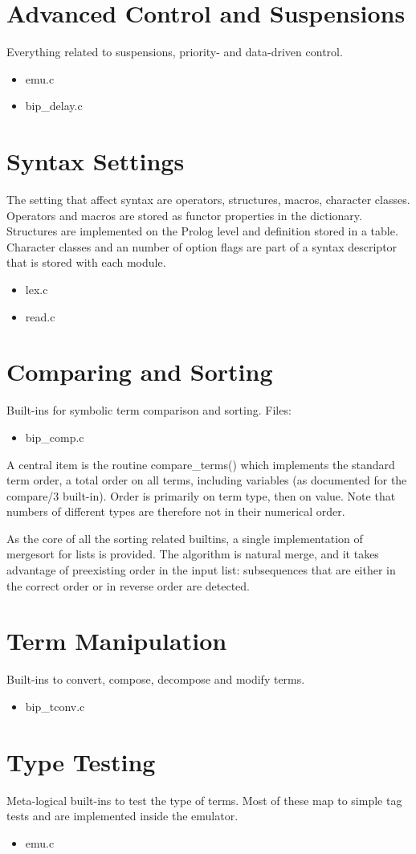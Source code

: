 \section{Advanced Control and Suspensions }
     Everything related to suspensions, priority- and data-driven control.
     \begin{itemize}
     \item emu.c
     \item bip_delay.c
     \end{itemize}

\section{Syntax Settings }
The setting that affect syntax are operators, structures, macros,
character classes.  Operators and macros are stored as functor
properties in the dictionary.  Structures are implemented on the
Prolog level and definition stored in a table. Character classes and
an number of option flags are part of a syntax descriptor that is stored
with each module.
     \begin{itemize}
     \item lex.c
     \item read.c
     \end{itemize}

\section{Comparing and Sorting }
Built-ins for symbolic term comparison and sorting. Files:
     \begin{itemize}
     \item bip_comp.c
     \end{itemize}
A central item is the routine compare_terms() which implements the standard
term order, a total order on all terms, including variables (as documented
for the compare/3 built-in). Order is primarily on term type, then on value.
Note that numbers of different types are therefore not in their numerical order.

As the core of all the sorting related builtins, a single implementation of
mergesort for lists is provided. The algorithm is natural merge, and
it takes advantage of preexisting order in the input list: subsequences
that are either in the correct order or in reverse order are detected.


\section{Term Manipulation }
     Built-ins to convert, compose, decompose and modify terms.
     \begin{itemize}
     \item bip_tconv.c
     \end{itemize}

\section{Type Testing }
     Meta-logical built-ins to test the type of terms.
     Most of these map to simple tag tests and are implemented
     inside the emulator.
     \begin{itemize}
     \item emu.c
     \end{itemize}
